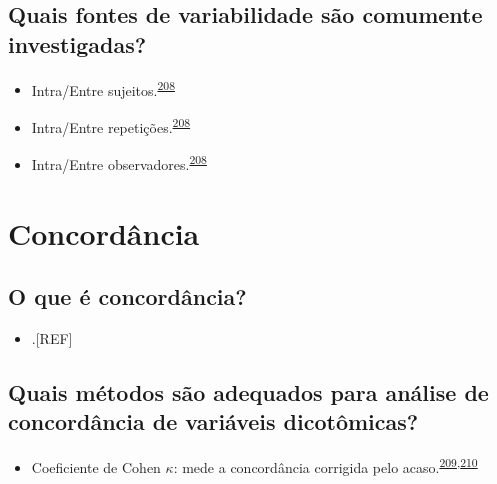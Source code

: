 \documentclass[
  a4paper,
]{book}
\providecommand{\tightlist}{%
  \setlength{\itemsep}{0pt}\setlength{\parskip}{0pt}}
\begin{document}
\hypertarget{quais-fontes-de-variabilidade-suxe3o-comumente-investigadas}{%
\subsection{Quais fontes de variabilidade são comumente investigadas?}\label{quais-fontes-de-variabilidade-suxe3o-comumente-investigadas}}

\begin{itemize}
\item
  Intra/Entre sujeitos.\textsuperscript{\protect\hyperlink{ref-altman1983}{208}}
\item
  Intra/Entre repetições.\textsuperscript{\protect\hyperlink{ref-altman1983}{208}}
\item
  Intra/Entre observadores.\textsuperscript{\protect\hyperlink{ref-altman1983}{208}}
\end{itemize}

\hypertarget{concordancia}{%
\section{Concordância}\label{concordancia}}

\hypertarget{o-que-uxe9-concorduxe2ncia}{%
\subsection{O que é concordância?}\label{o-que-uxe9-concorduxe2ncia}}

\begin{itemize}
\tightlist
\item
  .{[}REF{]}
\end{itemize}

\hypertarget{quais-muxe9todos-suxe3o-adequados-para-anuxe1lise-de-concorduxe2ncia-de-variuxe1veis-dicotuxf4micas}{%
\subsection{Quais métodos são adequados para análise de concordância de variáveis dicotômicas?}\label{quais-muxe9todos-suxe3o-adequados-para-anuxe1lise-de-concorduxe2ncia-de-variuxe1veis-dicotuxf4micas}}

\begin{itemize}
\tightlist
\item
  Coeficiente de Cohen \(\kappa\): mede a concordância corrigida pelo acaso.\textsuperscript{\protect\hyperlink{ref-scott1955}{209},\protect\hyperlink{ref-cohen1960}{210}}
\end{itemize}
\end{document}
